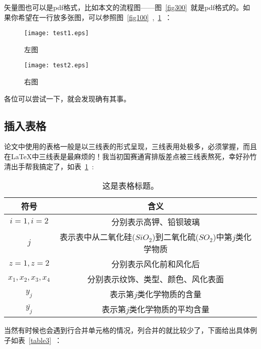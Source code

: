矢量图也可以是pdf格式，比如本文的流程图——图~\ref{fig300}~就是pdf格式的。如果你希望在一行放多张图，可以参照图~\ref{fig100}~,~\ref{fig101}~：


\begin{figure}[H]
	\centering
	\begin{minipage}[t]{0.48\textwidth}
		\centering
		\texttt{[image: test1.eps]}
		\caption{左图}
		\label{fig100}
	\end{minipage}
	\begin{minipage}[t]{0.48\textwidth}
		\centering
		\texttt{[image: test2.eps]}
		\caption{右图}
		\label{fig101}
	\end{minipage}
\end{figure}

各位可以尝试一下，就会发现确有其事。

\subsection{插入表格}



论文中使用的表格一般是以三线表的形式呈现，三线表用处极多，必须掌握，而且在\LaTeX 中三线表是最麻烦的！我当初国赛通宵排版差点被三线表熬死，幸好孙竹清出手帮我搞定了，如表~\ref{table10}~:

\begin{table}[H]
	\centering
		\caption{这是表格标题。}
		\begin{tabular}{c c}  %
			\toprule[1.5pt]   %
			符号 & 含义  \\ 
			\midrule[1pt]     %
			$i=1,i=2$ & 分别表示高钾、铅钡玻璃 \\ 
			$j$ & 表示表中从二氧化硅($SiO_2$)到二氧化硫($SO_2$)中第$j$类化学物质 \\
			$z=1,z=2$ & 分别表示风化前和风化后 \\
			$x_1,x_2,x_3,x_4$ & 分别表示纹饰、类型、颜色、风化表面 \\
			$y_j$ & 表示第$j$类化学物质的含量 \\ 
			$\overline{y_j}$ & 表示第$j$类化学物质的平均含量 \\  
			\toprule[1.5pt]   %
		\end{tabular}
		\label{table10}
\end{table}

当然有时候也会遇到行合并单元格的情况，列合并的就比较少了，下面给出具体例子如表~\ref{table3}~：

